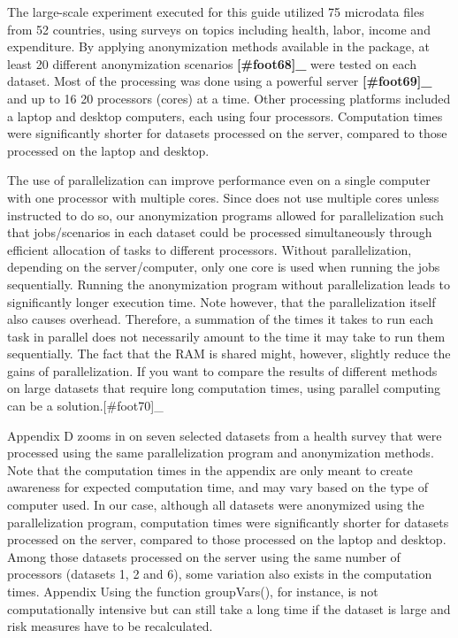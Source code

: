 \documentclass[letterpaper,10pt,english]{sphinxmanual}
\begin{document}
The large-scale experiment executed for this guide utilized 75 microdata
files from 52 countries, using surveys on topics including health,
labor, income and expenditure. By applying anonymization methods
available in the  package, at least 20 different anonymization
scenarios {\color{red}\bfseries{}{[}\#foot68{]}\_} were tested on each dataset. Most of the
processing was done using a powerful server {\color{red}\bfseries{}{[}\#foot69{]}\_} and up
to 16 \textendash{} 20 processors (cores) at a time. Other processing platforms
included a laptop and desktop computers, each using four processors.
Computation times were significantly shorter for datasets processed on
the server, compared to those processed on the laptop and desktop.

The use of parallelization can improve performance even on a single
computer with one processor with multiple cores. Since  does not use
multiple cores unless instructed to do so, our anonymization programs
allowed for parallelization such that jobs/scenarios in each dataset
could be processed simultaneously through efficient allocation of tasks
to different processors. Without parallelization, depending on the
server/computer, only one core is used when running the jobs
sequentially. Running the anonymization program without parallelization
leads to significantly longer execution time. Note however, that the
parallelization itself also causes overhead. Therefore, a summation of
the times it takes to run each task in parallel does not necessarily
amount to the time it may take to run them sequentially. The fact that
the RAM is shared might, however, slightly reduce the gains of
parallelization. If you want to compare the results of different methods
on large datasets that require long computation times, using parallel
computing can be a solution.{[}\#foot70{]}\_

Appendix D zooms in on seven selected datasets from a health survey that
were processed using the same parallelization program and anonymization
methods. Note that the computation times in the appendix are only meant
to create awareness for expected computation time, and may vary based on
the type of computer used. In our case, although all datasets were
anonymized using the parallelization program, computation times were
significantly shorter for datasets processed on the server, compared to
those processed on the laptop and desktop. Among those datasets
processed on the server using the same number of processors (datasets 1,
2 and 6), some variation also exists in the computation times.  Appendix 
Using the function groupVars(), for instance, is not computationally
intensive but can still take a long time if the dataset is large and
risk measures have to be recalculated.
\end{document}

